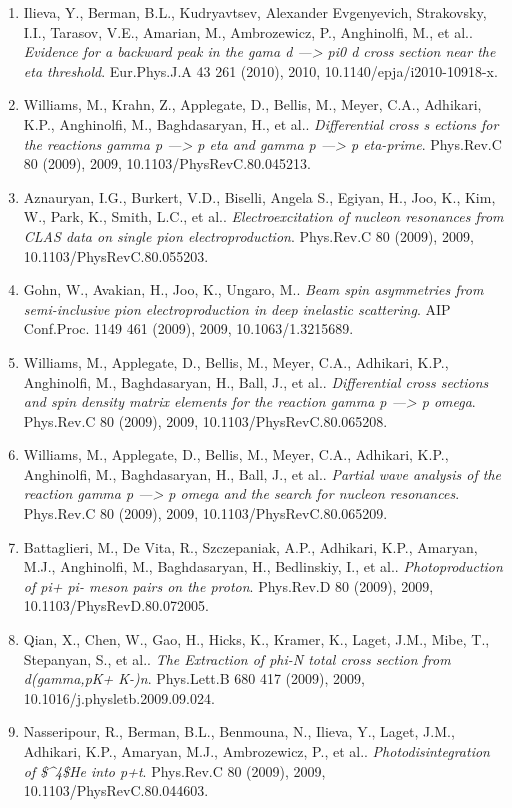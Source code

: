 \begin{enumerate}
\item Ilieva, Y., Berman, B.L., Kudryavtsev, Alexander Evgenyevich, Strakovsky, I.I., Tarasov, V.E., Amarian, M., Ambrozewicz, P., Anghinolfi, M., et al.. \textit{Evidence for a backward peak in the gama d ---> pi0 d cross section near the eta threshold}. Eur.Phys.J.A 43 261 (2010), 2010, 10.1140/epja/i2010-10918-x.
\item Williams, M., Krahn, Z., Applegate, D., Bellis, M., Meyer, C.A., Adhikari, K.P., Anghinolfi, M., Baghdasaryan, H., et al.. \textit{Differential cross s ections for the reactions gamma p ---> p eta and gamma p ---> p eta-prime}. Phys.Rev.C 80 (2009), 2009, 10.1103/PhysRevC.80.045213.
\item Aznauryan, I.G., Burkert, V.D., Biselli, Angela S., Egiyan, H., Joo, K., Kim, W., Park, K., Smith, L.C., et al.. \textit{Electroexcitation of nucleon resonances from CLAS data on single pion electroproduction}. Phys.Rev.C 80 (2009), 2009, 10.1103/PhysRevC.80.055203.
\item Gohn, W., Avakian, H., Joo, K., Ungaro, M.. \textit{Beam spin asymmetries from semi-inclusive pion electroproduction in deep inelastic scattering}. AIP Conf.Proc. 1149 461 (2009), 2009, 10.1063/1.3215689.
\item Williams, M., Applegate, D., Bellis, M., Meyer, C.A., Adhikari, K.P., Anghinolfi, M., Baghdasaryan, H., Ball, J., et al.. \textit{Differential cross sections and spin density matrix elements for the reaction gamma p ---> p omega}. Phys.Rev.C 80 (2009), 2009, 10.1103/PhysRevC.80.065208.
\item Williams, M., Applegate, D., Bellis, M., Meyer, C.A., Adhikari, K.P., Anghinolfi, M., Baghdasaryan, H., Ball, J., et al.. \textit{Partial wave analysis of the reaction gamma p ---> p omega and the search for nucleon resonances}. Phys.Rev.C 80 (2009), 2009, 10.1103/PhysRevC.80.065209.
\item Battaglieri, M., De Vita, R., Szczepaniak, A.P., Adhikari, K.P., Amaryan, M.J., Anghinolfi, M., Baghdasaryan, H., Bedlinskiy, I., et al.. \textit{Photoproduction of pi+ pi- meson pairs on the proton}. Phys.Rev.D 80 (2009), 2009, 10.1103/PhysRevD.80.072005.
\item Qian, X., Chen, W., Gao, H., Hicks, K., Kramer, K., Laget, J.M., Mibe, T., Stepanyan, S., et al.. \textit{The Extraction of phi-N total cross section from d(gamma,pK+ K-)n}. Phys.Lett.B 680 417 (2009), 2009, 10.1016/j.physletb.2009.09.024.
\item Nasseripour, R., Berman, B.L., Benmouna, N., Ilieva, Y., Laget, J.M., Adhikari, K.P., Amaryan, M.J., Ambrozewicz, P., et al.. \textit{Photodisintegration of \$\textasciicircum{}4\$He into p+t}. Phys.Rev.C 80 (2009), 2009, 10.1103/PhysRevC.80.044603.

\end{enumerate}
